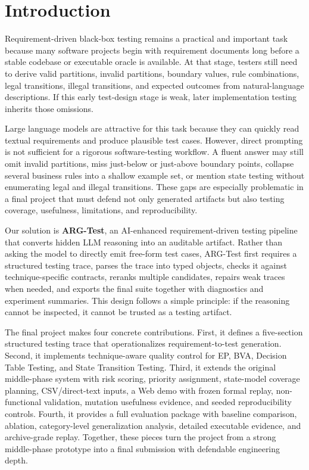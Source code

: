 \documentclass{article}
\begin{document}
\section{Introduction}
Requirement-driven black-box testing remains a practical and important task because many software projects begin with requirement documents long before a stable codebase or executable oracle is available. At that stage, testers still need to derive valid partitions, invalid partitions, boundary values, rule combinations, legal transitions, illegal transitions, and expected outcomes from natural-language descriptions. If this early test-design stage is weak, later implementation testing inherits those omissions.

Large language models are attractive for this task because they can quickly read textual requirements and produce plausible test cases. However, direct prompting is not sufficient for a rigorous software-testing workflow. A fluent answer may still omit invalid partitions, miss just-below or just-above boundary points, collapse several business rules into a shallow example set, or mention state testing without enumerating legal and illegal transitions. These gaps are especially problematic in a final project that must defend not only generated artifacts but also testing coverage, usefulness, limitations, and reproducibility.

Our solution is \textbf{ARG-Test}, an AI-enhanced requirement-driven testing pipeline that converts hidden LLM reasoning into an auditable artifact. Rather than asking the model to directly emit free-form test cases, ARG-Test first requires a structured testing trace, parses the trace into typed objects, checks it against technique-specific contracts, reranks multiple candidates, repairs weak traces when needed, and exports the final suite together with diagnostics and experiment summaries. This design follows a simple principle: if the reasoning cannot be inspected, it cannot be trusted as a testing artifact.

The final project makes four concrete contributions. First, it defines a five-section structured testing trace that operationalizes requirement-to-test generation. Second, it implements technique-aware quality control for EP, BVA, Decision Table Testing, and State Transition Testing. Third, it extends the original middle-phase system with risk scoring, priority assignment, state-model coverage planning, CSV/direct-text inputs, a Web demo with frozen formal replay, non-functional validation, mutation usefulness evidence, and seeded reproducibility controls. Fourth, it provides a full evaluation package with baseline comparison, ablation, category-level generalization analysis, detailed executable evidence, and archive-grade replay. Together, these pieces turn the project from a strong middle-phase prototype into a final submission with defendable engineering depth.
\end{document}
